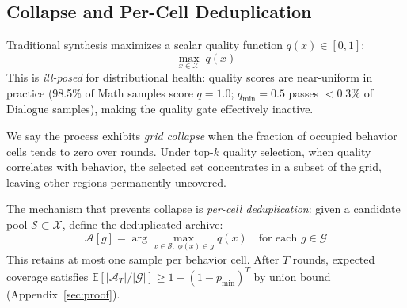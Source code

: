 \documentclass{article}
\begin{document}
\begin{enumerate}[nosep]
\subsection{Collapse and Per-Cell Deduplication}

Traditional synthesis maximizes a scalar quality function $q(x) \in [0,1]$:
\begin{equation}
\max_{x \in \mathcal{X}} \; q(x)
\label{eq:greedy}
\end{equation}
This is \emph{ill-posed} for distributional health: quality scores are near-uniform in practice (98.5\% of Math samples score $q{=}1.0$; $q_{\min}{=}0.5$ passes $<$0.3\% of Dialogue samples), making the quality gate effectively inactive.

We say the process exhibits \emph{grid collapse} when the fraction of occupied behavior cells tends to zero over rounds.
Under top-$k$ quality selection, when quality correlates with behavior, the selected set concentrates in a subset of the grid, leaving other regions permanently uncovered.

The mechanism that prevents collapse is \emph{per-cell deduplication}: given a candidate pool $\mathcal{S} \subset \mathcal{X}$, define the deduplicated archive:
\begin{equation}
\mathcal{A}[g] = \arg\max_{x \in \mathcal{S}:\; \phi(x) \in g} q(x) \quad \text{for each } g \in \mathcal{G}
\label{eq:dedup}
\end{equation}
This retains at most one sample per behavior cell.
After $T$ rounds, expected coverage satisfies $\mathbb{E}[|\mathcal{A}_T|/|\mathcal{G}|] \geq 1 - (1-p_{\min})^T$ by union bound (Appendix~\ref{sec:proof}).


\end{enumerate}
\end{document}
